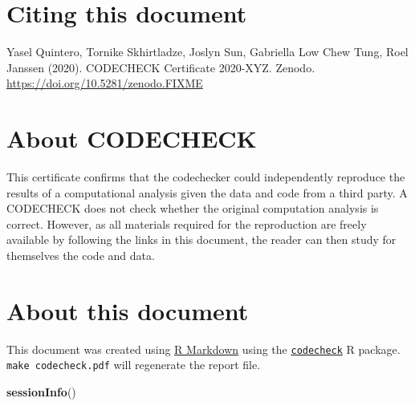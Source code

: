 \documentclass[
]{article}
\newenvironment{Shaded}{\begin{snugshade}}{\end{snugshade}}
\newcommand{\FunctionTok}[1]{\textcolor[rgb]{0.13,0.29,0.53}{\textbf{#1}}}
\newcommand{\NormalTok}[1]{#1}
\begin{document}
\section{Citing this document}\label{citing-this-document}

Yasel Quintero, Tornike Skhirtladze, Joslyn Sun, Gabriella Low Chew
Tung, Roel Janssen (2020). CODECHECK Certificate 2020-XYZ. Zenodo.
\url{https://doi.org/10.5281/zenodo.FIXME}

\section{About CODECHECK}\label{about-codecheck}

This certificate confirms that the codechecker could independently
reproduce the results of a computational analysis given the data and
code from a third party. A CODECHECK does not check whether the original
computation analysis is correct. However, as all materials required for
the reproduction are freely available by following the links in this
document, the reader can then study for themselves the code and data.

\section{About this document}\label{about-this-document}

This document was created using \href{https://rmarkdown.rstudio.com/}{R
Markdown} using the
\href{https://github.com/codecheckers/codecheck}{\texttt{codecheck}} R
package. \texttt{make\ codecheck.pdf} will regenerate the report file.

\begin{Shaded}
\begin{Highlighting}[]
\FunctionTok{sessionInfo}\NormalTok{()}
\end{Highlighting}
\end{Shaded}
\end{document}

